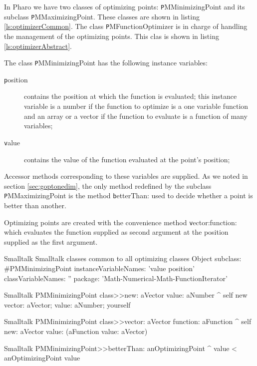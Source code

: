 In Pharo we have two classes of optimizing points: {\texttt PMMinimizingPoint}
and its subclass {\texttt PMMaximizingPoint}.
These classes are shown in listing
\ref{ls:optimizerCommon}.
The class {\texttt PMFunctionOptimizer} is
in charge of handling the management of the optimizing points.
This clas is shown in listing \ref{ls:optimizerAbstract}.

\noindent The class {\texttt PMMinimizingPoint} has the following
instance variables:
\begin{description}
  \item[\texttt position] contains the position at which the function
  is evaluated; this instance variable is a number if the function
  to optimize is a one variable function and an array or a vector
  if the function to evaluate is a function of many variables;
  \item[\texttt value] contains the value of the function evaluated at the point's position;
\end{description}
Accessor methods corresponding to these variables are supplied. As
we noted in section \ref{sec:goptonedim}, the only method
redefined by the subclass {\texttt PMMaximizingPoint} is the method
{\texttt betterThan:} used to decide whether a point is better than
another.

Optimizing points are created with the convenience method {\texttt
vector:function:} which evaluates the function supplied as second
argument at the position supplied as the first argument.

\begin{listing}[label=ls:optimizerCommon]{Smalltalk}
{Smalltalk classes common to all optimizing classes}
Object subclass: #PMMinimizingPoint
   instanceVariableNames: 'value position'
   classVariableNames: ''
   package: 'Math-Numerical-Math-FunctionIterator'
\end{listing}

\begin{displaycode}{Smalltalk}
PMMinimizingPoint class>>new: aVector value: aNumber
   ^ self new vector: aVector; value: aNumber; yourself  
\end{displaycode}  

\begin{displaycode}{Smalltalk}
PMMinimizingPoint class>>vector: aVector function: aFunction
   ^ self new: aVector value: (aFunction value: aVector)
\end{displaycode}

\begin{displaycode}{Smalltalk}
PMMinimizingPoint>>betterThan: anOptimizingPoint
   ^ value < anOptimizingPoint value
\end{displaycode}

